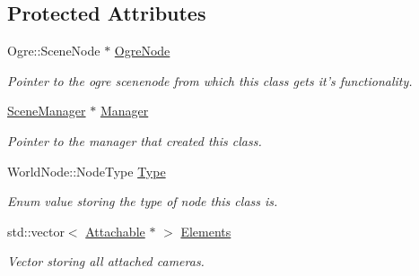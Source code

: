 \subsection*{Protected Attributes}
\begin{DoxyCompactItemize}
\item 
\hypertarget{classphys_1_1WorldNode_abc3e4ddcd1dc2f15ffa40ed2d18b5fd8}{
Ogre::SceneNode $\ast$ \hyperlink{classphys_1_1WorldNode_abc3e4ddcd1dc2f15ffa40ed2d18b5fd8}{OgreNode}}
\label{d2/d3e/classphys_1_1WorldNode_abc3e4ddcd1dc2f15ffa40ed2d18b5fd8}

\begin{DoxyCompactList}\small\item\em Pointer to the ogre scenenode from which this class gets it's functionality. \item\end{DoxyCompactList}\item 
\hypertarget{classphys_1_1WorldNode_a070f1686f70880dac0241c96518c7a8a}{
\hyperlink{classphys_1_1SceneManager}{SceneManager} $\ast$ \hyperlink{classphys_1_1WorldNode_a070f1686f70880dac0241c96518c7a8a}{Manager}}
\label{d2/d3e/classphys_1_1WorldNode_a070f1686f70880dac0241c96518c7a8a}

\begin{DoxyCompactList}\small\item\em Pointer to the manager that created this class. \item\end{DoxyCompactList}\item 
\hypertarget{classphys_1_1WorldNode_aef2329f38799c3d67f1f1f69b35dda20}{
WorldNode::NodeType \hyperlink{classphys_1_1WorldNode_aef2329f38799c3d67f1f1f69b35dda20}{Type}}
\label{d2/d3e/classphys_1_1WorldNode_aef2329f38799c3d67f1f1f69b35dda20}

\begin{DoxyCompactList}\small\item\em Enum value storing the type of node this class is. \item\end{DoxyCompactList}\item 
\hypertarget{classphys_1_1WorldNode_a2a17c53f3a7ad3d5bd322855096fcbc3}{
std::vector$<$ \hyperlink{classphys_1_1Attachable}{Attachable} $\ast$ $>$ \hyperlink{classphys_1_1WorldNode_a2a17c53f3a7ad3d5bd322855096fcbc3}{Elements}}
\label{d2/d3e/classphys_1_1WorldNode_a2a17c53f3a7ad3d5bd322855096fcbc3}

\begin{DoxyCompactList}\small\item\em Vector storing all attached cameras. \item\end{DoxyCompactList}\end{DoxyCompactItemize}



